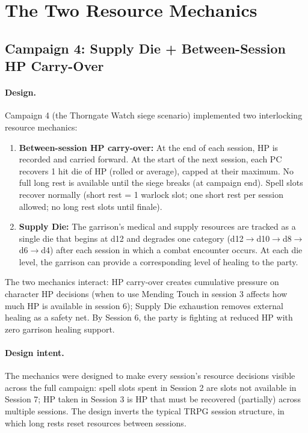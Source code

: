 
\section{The Two Resource Mechanics}
\label{sec:mechanics}

\subsection{Campaign 4: Supply Die + Between-Session HP Carry-Over}

\paragraph{Design.}
Campaign 4 (the Thorngate Watch siege scenario) implemented two interlocking resource
mechanics:

\begin{enumerate}
  \item \textbf{Between-session HP carry-over:} At the end of each session, HP is recorded
    and carried forward. At the start of the next session, each PC recovers 1 hit die of
    HP (rolled or average), capped at their maximum. No full long rest is available until
    the siege breaks (at campaign end). Spell slots recover normally (short rest = 1 warlock
    slot; one short rest per session allowed; no long rest slots until finale).

  \item \textbf{Supply Die:} The garrison's medical and supply resources are tracked as a
    single die that begins at d12 and degrades one category (d12$\to$d10$\to$d8$\to$d6$\to$d4)
    after each session in which a combat encounter occurs. At each die level, the garrison
    can provide a corresponding level of healing to the party.
\end{enumerate}

The two mechanics interact: HP carry-over creates cumulative pressure on character HP
decisions (when to use Mending Touch in session 3 affects how much HP is available in
session 6); Supply Die exhaustion removes external healing as a safety net. By Session 6,
the party is fighting at reduced HP with zero garrison healing support.

\paragraph{Design intent.}
The mechanics were designed to make every session's resource decisions visible across
the full campaign: spell slots spent in Session 2 are slots not available in Session 7;
HP taken in Session 3 is HP that must be recovered (partially) across multiple sessions.
The design inverts the typical TRPG session structure, in which long rests reset resources
between sessions.


